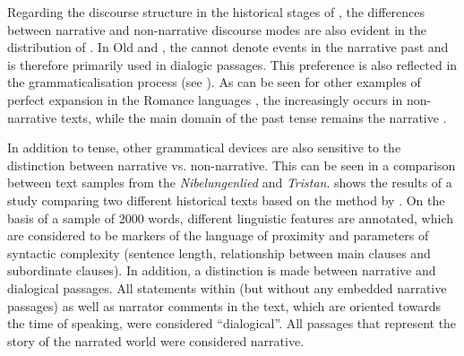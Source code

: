 \documentclass[output=paper,colorlinks,citecolor=brown]{langscibook}
\begin{document}
Regarding the discourse structure in the historical stages of , the differences between narrative and non-narrative discourse modes are also evident in the distribution of . In Old and , the  cannot denote events in the narrative past \citep{Zeman2010} and is therefore primarily used in dialogic passages. This preference is also reflected in the grammaticalisation process (see \citealt{Fischer2020}). As can be seen for other examples of perfect expansion in the Romance languages \citep[9]{Drinka2017}, the  increasingly occurs in non-narrative texts, while the main domain of the past tense remains the narrative .

In addition to tense, other grammatical devices are also sensitive to the distinction between narrative vs. non-narrative. This can be seen in a comparison between text samples from the \textit{Nibelungenlied} and \textit{Tristan}.  shows the results of a study comparing two different historical texts based on the method by \citet{ÁgelHennig2006}. On the basis of a sample of 2000 words, different linguistic features are annotated, which are considered to be markers of the language of proximity and parameters of syntactic complexity (sentence length, relationship between main clauses and subordinate clauses). In addition, a distinction is made between narrative and dialogical passages. All statements within  (but without any embedded narrative passages) as well as narrator comments in the text, which are oriented towards the time of speaking, were considered “dialogical”. All passages that represent the story of the narrated world were considered narrative.
\end{document}
